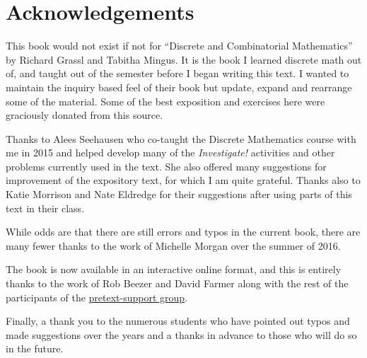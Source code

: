 \documentclass[11pt,]{book}
\theoremstyle{ptxplainnotitle}
\theoremstyle{ptxplaintitle}
\theoremstyle{ptxdefinitionnotitle}
\theoremstyle{ptxdefinitiontitle}
\theoremstyle{ptxdefinitionnotitle}
\theoremstyle{ptxdefinitiontitle}
\theoremstyle{ptxdefinitionnotitle}
\theoremstyle{ptxdefinitiontitle}
\theoremstyle{ptxdefinitiontitlenonumber}
\theoremstyle{ptxdefinitiontitlenonumber}
\numberwithin{equation}{chapter}
\begin{document}
\frontmatter


\chapter*{Acknowledgements}\label{acknowledgement-1}
\hypertarget{p-1}{}%
This book would not exist if not for ``Discrete and Combinatorial Mathematics'' by Richard Grassl and Tabitha Mingus. It is the book I learned discrete math out of, and taught out of the semester before I began writing this text. I wanted to maintain the inquiry based feel of their book but update, expand and rearrange some of the material.  Some of the best exposition and exercises here were graciously donated from this source.%
\par
\hypertarget{p-2}{}%
Thanks to Alees Seehausen who co-taught the Discrete Mathematics course with me in 2015 and helped develop many of the \emph{Investigate!} activities and other problems currently used in the text. She also offered many suggestions for improvement of the expository text, for which I am quite grateful. Thanks also to Katie Morrison and Nate Eldredge for their suggestions after using parts of this text in their class.%
\par
\hypertarget{p-3}{}%
While odds are that there are still errors and typos in the current book, there are many fewer thanks to the work of Michelle Morgan over the summer of 2016.%
\par
\hypertarget{p-4}{}%
The book is now available in an interactive online format, and this is entirely thanks to the work of Rob Beezer and David Farmer along with the rest of the participants of the \href{https://groups.google.com/forum/\#!forum/pretext-support}{pretext-support group}.%
\par
\hypertarget{p-5}{}%
Finally, a thank you to the numerous students who have pointed out typos and made suggestions over the years and a thanks in advance to those who will do so in the future.%
\end{document}
